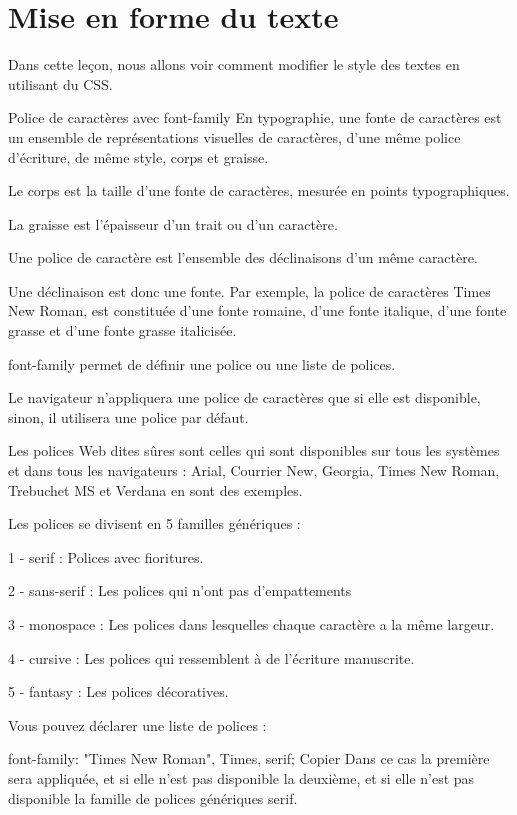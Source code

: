 \documentclass[a4paper]{article}
\begin{document}

\section{Mise en forme du texte}
Dans cette leçon, nous allons voir comment modifier le style des textes en utilisant du CSS.

Police de caractères avec font-family
En typographie, une fonte de caractères est un ensemble de représentations visuelles de caractères, d'une même police d'écriture, de même style, corps et graisse.

Le corps est la taille d'une fonte de caractères, mesurée en points typographiques.

La graisse est l'épaisseur d'un trait ou d'un caractère.

Une police de caractère est l'ensemble des déclinaisons d'un même caractère.

Une déclinaison est donc une fonte. Par exemple, la police de caractères Times New Roman, est constituée d'une fonte romaine, d'une fonte italique, d'une fonte grasse et d'une fonte grasse italicisée.

font-family permet de définir une police ou une liste de polices.

Le navigateur n'appliquera une police de caractères que si elle est disponible, sinon, il utilisera une police par défaut.

Les polices Web dites sûres sont celles qui sont disponibles sur tous les systèmes et dans tous les navigateurs : Arial, Courrier New, Georgia, Times New Roman, Trebuchet MS et Verdana en sont des exemples.

Les polices se divisent en 5 familles génériques :

1 - serif : Polices avec fioritures.

2 - sans-serif : Les polices qui n'ont pas d'empattements

3 - monospace : Les polices dans lesquelles chaque caractère a la même largeur.

4 - cursive : Les polices qui ressemblent à de l'écriture manuscrite.

5 - fantasy : Les polices décoratives.

Vous pouvez déclarer une liste de polices :

font-family: "Times New Roman", Times, serif;
Copier
Dans ce cas la première sera appliquée, et si elle n'est pas disponible la deuxième, et si elle n'est pas disponible la famille de polices génériques serif.
\end{document}
